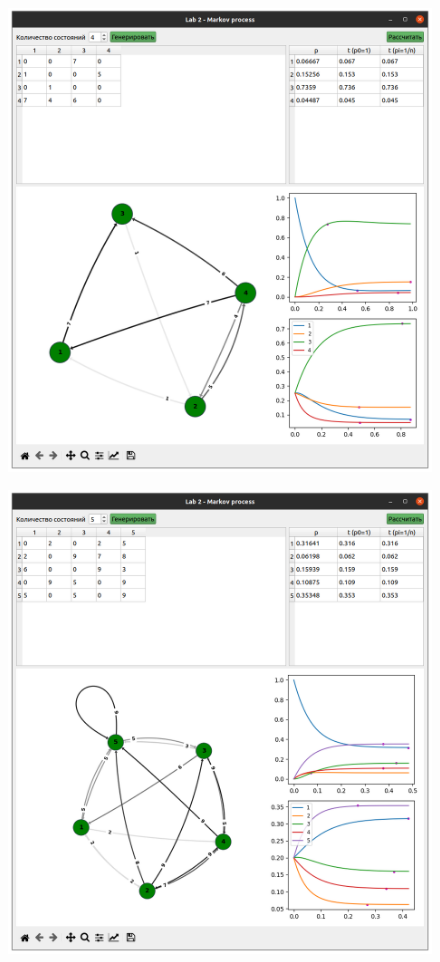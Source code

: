 \begin{figure}[h!]
    \includegraphics[width=\textwidth]{2/4}
\end{figure}
\begin{figure}[h!]
    \includegraphics[width=\textwidth]{2/5}
\end{figure}
